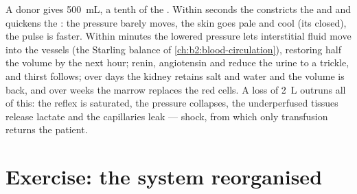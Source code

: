 \begin{example}[A haemorrhage]\label{ex:b2:blood-pressure:haemorrhage}
A donor gives \qty{500}{mL}, a tenth of the . Within seconds the
 constricts the  and  and quickens the
: the pressure barely moves, the skin goes pale and cool
(its  closed), the pulse is faster. Within minutes the
lowered  pressure lets interstitial fluid move into the
vessels (the Starling balance of \cref{ch:b2:blood-circulation}),
restoring half the volume by the next hour; renin, angiotensin and
 reduce the urine to a trickle, and thirst
follows; over days the kidney retains salt and water and the 
volume is back, and over weeks the marrow replaces the red cells. A
loss of \qty{2}{L} outruns all of this: the reflex is saturated,
the pressure collapses, the underperfused tissues release lactate
and the capillaries leak --- shock, from which only transfusion
returns the patient.
\end{example}

\section{Exercise: the system reorganised}

